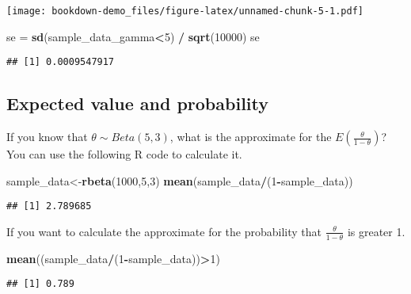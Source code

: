 \documentclass[]{book}
\newenvironment{Shaded}{\begin{snugshade}}{\end{snugshade}}
\newcommand{\DecValTok}[1]{\textcolor[rgb]{0.00,0.00,0.81}{#1}}
\newcommand{\KeywordTok}[1]{\textcolor[rgb]{0.13,0.29,0.53}{\textbf{#1}}}
\newcommand{\NormalTok}[1]{#1}
\newcommand{\OperatorTok}[1]{\textcolor[rgb]{0.81,0.36,0.00}{\textbf{#1}}}
\newcommand{\StringTok}[1]{\textcolor[rgb]{0.31,0.60,0.02}{#1}}
\begin{document}
\texttt{[image: bookdown-demo\_files/figure-latex/unnamed-chunk-5-1.pdf]}

\begin{Shaded}
\begin{Highlighting}[]
\NormalTok{se =}\StringTok{ }\KeywordTok{sd}\NormalTok{(sample_data_gamma}\OperatorTok{<}\DecValTok{5}\NormalTok{) }\OperatorTok{/}\StringTok{ }\KeywordTok{sqrt}\NormalTok{(}\DecValTok{10000}\NormalTok{)}
\NormalTok{se}
\end{Highlighting}
\end{Shaded}

\begin{verbatim}
## [1] 0.0009547917
\end{verbatim}

\hypertarget{expected-value-and-probability}{%
\subsection{Expected value and probability}\label{expected-value-and-probability}}

If you know that \(\theta \sim Beta(5,3)\), what is the approximate for the \(E(\frac{\theta}{1-\theta})\)? You can use the following R code to calculate it.

\begin{Shaded}
\begin{Highlighting}[]
\NormalTok{sample_data<-}\KeywordTok{rbeta}\NormalTok{(}\DecValTok{1000}\NormalTok{,}\DecValTok{5}\NormalTok{,}\DecValTok{3}\NormalTok{)}
\KeywordTok{mean}\NormalTok{(sample_data}\OperatorTok{/}\NormalTok{(}\DecValTok{1}\OperatorTok{-}\NormalTok{sample_data))}
\end{Highlighting}
\end{Shaded}

\begin{verbatim}
## [1] 2.789685
\end{verbatim}

If you want to calculate the approximate for the probability that \(\frac{\theta}{1-\theta}\) is greater 1.

\begin{Shaded}
\begin{Highlighting}[]
\KeywordTok{mean}\NormalTok{((sample_data}\OperatorTok{/}\NormalTok{(}\DecValTok{1}\OperatorTok{-}\NormalTok{sample_data))}\OperatorTok{>}\DecValTok{1}\NormalTok{)}
\end{Highlighting}
\end{Shaded}

\begin{verbatim}
## [1] 0.789
\end{verbatim}
\end{document}
